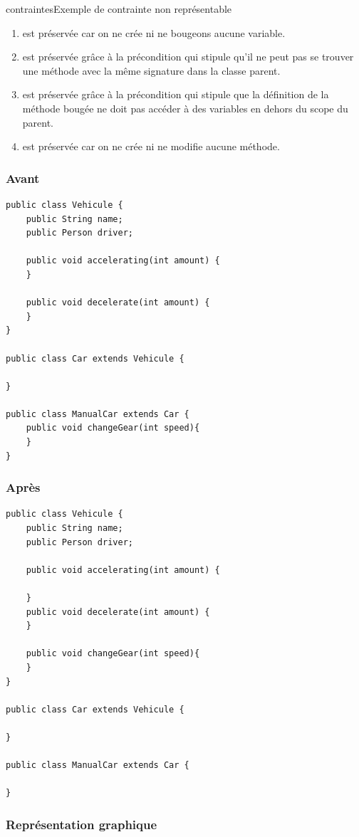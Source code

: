 \documentclass[a4paper, 12pt]{article}
\begin{document}
\begin{figu}{contraintes}{Exemple de contrainte non représentable}
\begin{enumerate}
\item est préservée car on ne crée ni ne bougeons aucune variable.
\item est préservée grâce à la précondition qui stipule qu'il ne peut pas se trouver une méthode avec la même signature dans la classe parent.
\item est préservée grâce à la précondition qui stipule que la définition de la méthode bougée ne doit pas accéder à des variables en dehors du scope du parent.
\item est préservée car on ne crée ni ne modifie aucune méthode.
\end{enumerate}

\subsubsection{Avant}
\begin{lstlisting}[frame=single]
public class Vehicule {
	public String name;
	public Person driver;

	public void accelerating(int amount) {
	}

	public void decelerate(int amount) {
	}
}

public class Car extends Vehicule {

}

public class ManualCar extends Car {
	public void changeGear(int speed){
	}
}
\end{lstlisting}

\subsubsection{Après}
\begin{lstlisting}[frame=single]
public class Vehicule {
	public String name;
	public Person driver;

	public void accelerating(int amount) {

	}
	public void decelerate(int amount) {
	}

	public void changeGear(int speed){
	}
}

public class Car extends Vehicule {

}

public class ManualCar extends Car {

}
\end{lstlisting}

\subsubsection{Représentation graphique}


\end{figu}
\end{document}

